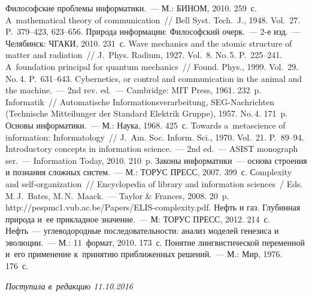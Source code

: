  \begin{multicols}{2}

\renewcommand{\bibname}{\protect\rmfamily Литература}

{\small\frenchspacing
{%
\begin{thebibliography}{99}
 Философские проблемы информатики.~--- М.: БИНОМ, 
2010. 259~с.
 A~mathematical theory of communication~// Bell Syst. 
Tech.~J., 1948. Vol.~27. P.~379--423, 623--656.
 Природа информации: Философский очерк.~--- 2-е изд.~--- 
Челябинск: ЧГАКИ, 2010. 231~с.
 Wave mechanics and the atomic structure of matter and 
radiation~// J.~Phys. Radium, 1927. Vol.~8. No.\,5. P.~225--241.
 A~foundation principal for quantum mechanics~// Found. 
Phys., 1999. Vol.~29. No.\,4. P.~631--643.
 Cybernetics, or control and communication in the animal and the 
machine.~--- 2nd rev. ed.~--- Cambridge: MIT Press, 1961. 232~p.
 Informatik~// Automatische Informationsverarbeitung,  
SEG-Nachrichten (Technische Mitteilunger der Standard Elektrik Gruppe), 1957. 
No.\,4. 171~p.
 Основы 
информатики.~--- М.: Наука, 1968. 425~с.
 Towards a~metascience of information: 
Informatology~// J.~Am. Soc. Inform. Sci., 1970. Vol.~21.  
P.~89--94.
 Introductory concepts in information science.~--- 2nd ed.~--- 
ASIST monograph ser.~--- Information Today, 2010. 210~p.
 Законы информатики~--- основа строения и познания 
сложных систем.~--- М.: ТОРУС ПРЕСС, 2007. 399~с.
 Сomplexity and self-organization~// Encyclopedia of library 
and information sciences~/ Eds. M.\,J.~Bates, M.\,N.~Maack.~--- Taylor \& 
Frances, 2008. 20~p. {\sf http://pespmc1.vub.ac.be/Papers/ELIS-complexity.pdf}.
 Нефть и газ. Глубинная природа и~ее 
прикладное значение.~--- М: ТОРУС ПРЕСС, 2012. 214~с.
 Нефть~--- углеводородные последовательности: 
анализ моделей генезиса и эволюции.~--- М.: 11~формат, 2010. 173~с.
 Понятие лингвистической переменной и~его применение 
к~принятию приближенных решений.~--- М.: Мир, 1976. 176~с.

\end{thebibliography}
} }

\end{multicols}

 \label{end\stat}

 \vspace*{-3pt}

\hfill{\small\textit{Поступила в~редакцию  11.10.2016}}
\renewcommand{\figurename}{\protect\bf Рис.}
\renewcommand{\tablename}{\protect\bf Таблица} 